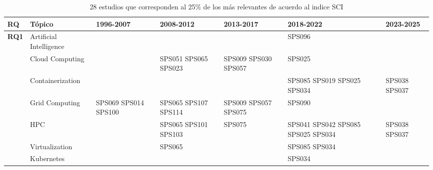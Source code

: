 \begin{table*}[htbp]
	\centering
	\caption{28 estudios que corresponden al 25\% de los más relevantes de acuerdo al indice SCI}
	\label{table:highest_SCI}
	\renewcommand{\arraystretch}{1.2}
	\setlength{\tabcolsep}{6pt}
	\begin{tabularx}{\textwidth}{p{0.8cm}p{2.5cm}>{\raggedright\arraybackslash}X>{\raggedright\arraybackslash}X>{\raggedright\arraybackslash}X>{\raggedright\arraybackslash}X>{\raggedright\arraybackslash}X}
		\toprule
		\textbf{RQ}                          & \textbf{Tópico}         & \textbf{1996-2007}   & \textbf{2008-2012}   & \textbf{2013-2017}   & \textbf{2018-2022}                 & \textbf{2023-2025} \\
		\midrule
		\multirow{12}{*}[0em]{\textbf{RQ1}}  & Artificial Intelligence &                      &                      &                      & SPS096                             &                    \\
		\addlinespace[0.3em]
		                                     & Cloud Computing         &                      & SPS051 SPS065 SPS023 & SPS009 SPS030 SPS057 & SPS025                             &                    \\
		\addlinespace[0.3em]
		                                     & Containerization        &                      &                      &                      & SPS085 SPS019 SPS025 SPS034        & SPS038 SPS037      \\
		\addlinespace[0.3em]
		                                     & Grid Computing          & SPS069 SPS014 SPS100 & SPS065 SPS107 SPS114 & SPS009 SPS057 SPS075 & SPS090                             &                    \\
		\addlinespace[0.3em]
		                                     & HPC                     &                      & SPS065 SPS101 SPS103 & SPS075               & SPS041 SPS042 SPS085 SPS025 SPS034 & SPS038 SPS037      \\
		\addlinespace[0.3em]
		                                     & Virtualization          &                      & SPS065               &                      & SPS085 SPS034                      &                    \\
		\addlinespace[0.3em]
		                                     & Kubernetes              &                      &                      &                      & SPS034                             &                    \\

\end{tabularx}
\end{table*}
